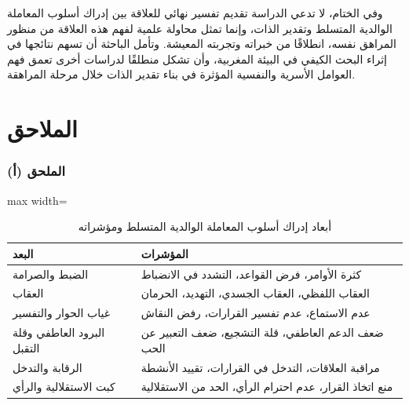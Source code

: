\documentclass[12pt,oneside]{report}
\begin{document}
وفي الختام، لا تدعي الدراسة تقديم تفسير نهائي للعلاقة بين إدراك أسلوب المعاملة الوالدية المتسلط وتقدير الذات، وإنما تمثل محاولة علمية لفهم هذه العلاقة من منظور المراهق نفسه، انطلاقًا من خبراته وتجربته المعيشة. وتأمل الباحثة أن تسهم نتائجها في إثراء البحث الكيفي في البيئة المغربية، وأن تشكل منطلقًا لدراسات أخرى تعمق فهم العوامل الأسرية والنفسية المؤثرة في بناء تقدير الذات خلال مرحلة المراهقة.

\chapter*{الملاحق}
\subsection*{الملحق (أ)}
\begin{table}[H]
\centering
\caption{أبعاد إدراك أسلوب المعاملة الوالدية المتسلط ومؤشراته}
\small
\renewcommand{\arraystretch}{1.3}
\setlength{\tabcolsep}{4pt}
\begin{adjustbox}{max width=\textwidth}
\begin{tabular}{p{3.8cm} p{9.6cm}}
\toprule
\textbf{البعد} & \textbf{المؤشرات} \\
\midrule
الضبط والصرامة & كثرة الأوامر، فرض القواعد، التشدد في الانضباط \\
العقاب & العقاب اللفظي، العقاب الجسدي، التهديد، الحرمان \\
غياب الحوار والتفسير & عدم الاستماع، عدم تفسير القرارات، رفض النقاش \\
البرود العاطفي وقلة التقبل & ضعف الدعم العاطفي، قلة التشجيع، ضعف التعبير عن الحب \\
الرقابة والتدخل & مراقبة العلاقات، التدخل في القرارات، تقييد الأنشطة \\
كبت الاستقلالية والرأي & منع اتخاذ القرار، عدم احترام الرأي، الحد من الاستقلالية \\
\bottomrule
\end{tabular}
\end{adjustbox}
\end{table}
\end{document}
